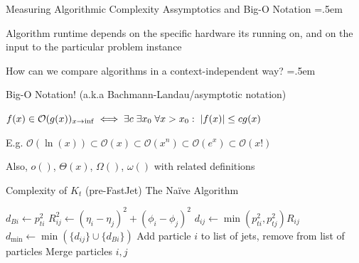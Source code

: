 \documentclass[xcolor={dvipsnames}]{beamer}
\let\olditemize=\itemize
\let\endolditemize=\enditemize
\renewenvironment{itemize}{\olditemize \itemsep=.5em }{\endolditemize}
\newcommand{\ord}[1]{\mathcal{O}(#1)}
\begin{document}
\begin{frame}{Measuring Algorithmic Complexity}
\alert{Assymptotics and Big-O Notation}
\begin{itemize}
    \item<2-> Algorithm runtime depends on the specific hardware its running on, and on the input to the particular problem instance
    \item<3-> How can we compare algorithms in a context-independent way?
    \begin{itemize}
        \item<4-> Big-O Notation! (a.k.a Bachmann-Landau/asymptotic notation)
        \item<5->[] $f(x) \in \ord{g(x)}_{x\to\inf} \iff \exists c\; \exists x_0\; \forall x>x_0:\; \abs{f(x)} \leq cg(x)$
        \item<6-> E.g. $\ord{\ln(x)} \subset \ord{x} \subset \ord{x^n} \subset \ord{e^x} \subset \ord{x!}$
        \item<7-> Also, $o()$, $\Theta(x)$, $\Omega()$, $\omega()$ with related definitions
    \end{itemize}
    
\end{itemize}
\end{frame}

\begin{frame}{Complexity of $K_t$ (pre-FastJet)}
\alert{The Naïve Algorithm}
\begin{algorithm}[H]
    \caption{Naïve $K_t$}
    \begin{algorithmic}[1]
        \Repeat
                \State $d_{Bi} \gets p_{ti}^2$ 
                \State $R_{ij}^2 \gets (\eta_i - \eta_j)^2  + (\phi_i - \phi_j)^2$ 
                \State $d_{ij} \gets \min(p_{ti}^2, p_{tj}^2)R_{ij}$
            \EndFor
            \State $d_\text{min} \gets \min(\{d_{ij}\}\cup\{d_{Bi}\})$
                \State Add particle $i$ to list of jets, remove from list of particles
            \Else{}
                \State Merge particles $i, j$
            \EndIf
    \end{algorithmic}
\end{algorithm}
\end{frame}
\end{document}
